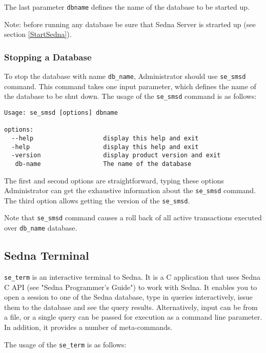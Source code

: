 \documentclass[a4paper,12pt]{article}
\begin{document}
The last parameter \verb!dbname!  defines the name of the database to be started up. 


Note: before running any database be sure that Sedna Server is strarted up (see section \ref{StartSedna}).

\subsubsection{Stopping a Database}
\label{StopDB}

To stop the database with name \verb!db_name!, Administrator should use \verb!se_smsd! command. This command takes one input parameter, which defines the name of the database to be shut down. The usage of the \verb!se_smsd! command is as follows:

\begin{verbatim}
Usage: se_smsd [options] dbname

options:
  --help                   display this help and exit
  -help                    display this help and exit
  -version                 display product version and exit
   db-name                 The name of the database
\end{verbatim}

The first and second options are straightforward, typing these options Administrator can get the exhaustive information about the \verb!se_smsd! command.
The third option allows getting the version of the \verb!se_smsd!.

Note that \verb!se_smsd! command causes a roll back of all active transactions executed over \verb!db_name! database.


\subsection{Sedna Terminal}
\label{terminal}
\verb!se_term! is an interactive terminal to Sedna. It is a C application that uses Sedna C API (see "Sedna Programmer's Guide") to work with Sedna. It enables you to open a session to one of the Sedna database, type in queries interactively, issue them to the database and see the query results. Alternatively, input can be from a file, or a single query can be passed for execution as a command line parameter. In addition, it provides a number of meta-commands. 

The usage of the \verb!se_term! is as follows:
\end{document}
